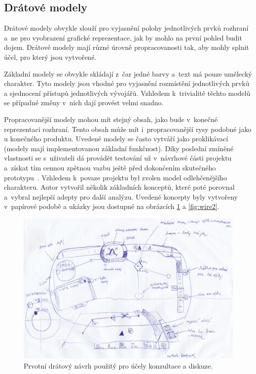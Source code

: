 \subsection{Drátové modely} %
Drátové modely obvykle slouží pro vyjasnění polohy jednotlivých prvků rozhraní a~ne  pro vyobrazení grafické reprezentace, jak by mohlo na první pohled budit dojem. Drátové modely mají různé úrovně propracovanosti tak, aby mohly splnit účel, pro který jsou vytvořené.

Základní modely se obvykle skládají z~čar jedné barvy a~text má pouze umělecký charakter. Tyto modely jsou vhodné pro vyjasnění rozmístění jednotlivých prvků a sjednocení přístupů jednotlivých vývojářů. Vzhledem k~trivialitě těchto modelů se případné změny v~nich dají provést velmi snadno.

Propracovanější modely mohou mít stejný obsah, jako bude v~konečné reprezentaci rozhraní. Tento obsah může mít i~propracovanější rysy podobné jako u konečného produktu. Uvedené modely se často vytváří jako proklikávací (modely mají implementovanou základní funkčnost). Díky poslední zmíněné vlastnosti se s~uživateli dá provádět testování už v~návrhové části projektu a~získat tím cennou zpětnou vazbu ještě před dokončením skutečného prototypu~\cite{Wireframing,KomárekJakub2022Nzps}. Vzhledem k~povaze projektu byl zvolen model odlehčenějšího charakteru. Autor vytvořil několik základních konceptů, které poté porovnal a~vybral nejlepší adepty pro další analýzu. Uvedené koncepty byly vytvořeny v~papírové podobě a ukázky jsou dostupné na obrázcích \ref{fig:wire1} a \ref{fig:wire2}. 


\begin{figure}[H]
    \centering
    \includegraphics[width=\linewidth]{obrazky-figures/navrh/allWired.png}
    \caption{Prvotní drátový návrh použitý pro účely konzultace a diskuze. }
    \label{fig:wire1}
\end{figure}

